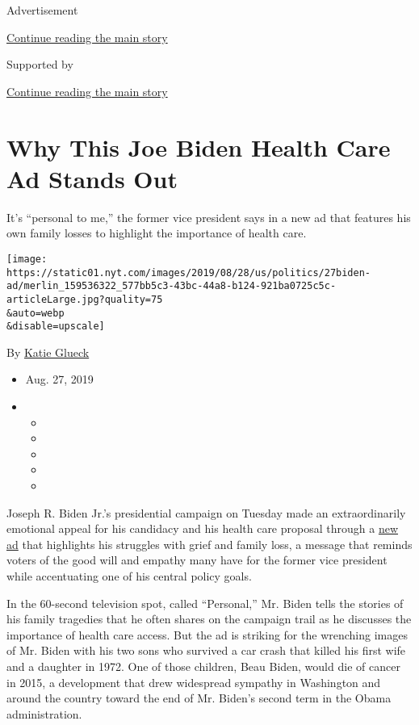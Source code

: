 Advertisement

\protect\hyperlink{after-top}{Continue reading the main story}

Supported by

\protect\hyperlink{after-sponsor}{Continue reading the main story}

\hypertarget{why-this-joe-biden-health-care-ad-stands-out}{%
\section{Why This Joe Biden Health Care Ad Stands
Out}\label{why-this-joe-biden-health-care-ad-stands-out}}

It's ``personal to me,'' the former vice president says in a new ad that
features his own family losses to highlight the importance of health
care.

\texttt{[image: https://static01.nyt.com/images/2019/08/28/us/politics/27biden-ad/merlin\_159536322\_577bb5c3-43bc-44a8-b124-921ba0725c5c-articleLarge.jpg?quality=75\\\&auto=webp\\\&disable=upscale]}

By \href{https://www.nytimes.com/by/katie-glueck}{Katie Glueck}

\begin{itemize}
\item
  Aug. 27, 2019
\item
  \begin{itemize}
  \item
  \item
  \item
  \item
  \item
  \end{itemize}
\end{itemize}

Joseph R. Biden Jr.'s presidential campaign on Tuesday made an
extraordinarily emotional appeal for his candidacy and his health care
proposal through a
\href{https://www.youtube.com/watch?v=vi4bcatoFns\&feature=youtu.be}{new
ad} that highlights his struggles with grief and family loss, a message
that reminds voters of the good will and empathy many have for the
former vice president while accentuating one of his central policy
goals.

In the 60-second television spot, called ``Personal,'' Mr. Biden tells
the stories of his family tragedies that he often shares on the campaign
trail as he discusses the importance of health care access. But the ad
is striking for the wrenching images of Mr. Biden with his two sons who
survived a car crash that killed his first wife and a daughter in 1972.
One of those children, Beau Biden, would die of cancer in 2015, a
development that drew widespread sympathy in Washington and around the
country toward the end of Mr. Biden's second term in the Obama
administration.

